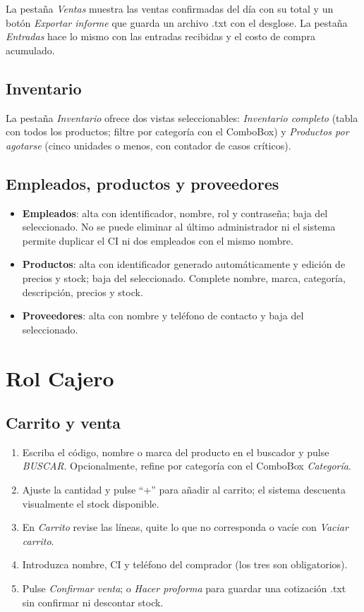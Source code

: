 \documentclass[12pt,a4paper]{report}
\begin{document}
La pestaña \emph{Ventas} muestra las ventas confirmadas del día con su total y un botón \emph{Exportar informe} que guarda un archivo .txt con el desglose. La pestaña \emph{Entradas} hace lo mismo con las entradas recibidas y el costo de compra acumulado.

\subsection{Inventario}
La pestaña \emph{Inventario} ofrece dos vistas seleccionables: \emph{Inventario completo} (tabla con todos los productos; filtre por categoría con el ComboBox) y \emph{Productos por agotarse} (cinco unidades o menos, con contador de casos críticos).

\subsection{Empleados, productos y proveedores}
\begin{itemize}
\item \textbf{Empleados}: alta con identificador, nombre, rol y contraseña; baja del seleccionado. No se puede eliminar al último administrador ni el sistema permite duplicar el CI ni dos empleados con el mismo nombre.
\item \textbf{Productos}: alta con identificador generado automáticamente y edición de precios y stock; baja del seleccionado. Complete nombre, marca, categoría, descripción, precios y stock.
\item \textbf{Proveedores}: alta con nombre y teléfono de contacto y baja del seleccionado.
\end{itemize}

\section{Rol Cajero}

\subsection{Carrito y venta}

\begin{enumerate}
\item Escriba el código, nombre o marca del producto en el buscador y pulse \emph{BUSCAR}. Opcionalmente, refine por categoría con el ComboBox \emph{Categoría}.
\item Ajuste la cantidad y pulse ``+'' para añadir al carrito; el sistema descuenta visualmente el stock disponible.
\item En \emph{Carrito} revise las líneas, quite lo que no corresponda o vacíe con \emph{Vaciar carrito}.
\item Introduzca nombre, CI y teléfono del comprador (los tres son obligatorios).
\item Pulse \emph{Confirmar venta}; o \emph{Hacer proforma} para guardar una cotización .txt sin confirmar ni descontar stock.
\end{enumerate}
\end{document}
